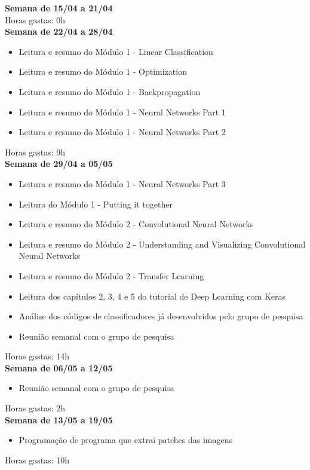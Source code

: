 \documentclass{article}
\begin{document}
\begin{appendices}
{			\textbf{Semana de 15/04 a 21/04} \\
			Horas gastas: 0h \\
			
			\textbf{Semana de 22/04 a 28/04}
			\begin{itemize}
				\item Leitura e resumo do Módulo 1 - Linear Classification 
				\item Leitura e resumo do Módulo 1 - Optimization 
				\item Leitura e resumo do Módulo 1 - Backpropagation 
				\item Leitura e resumo do Módulo 1 - Neural Networks Part 1 
				\item Leitura e resumo do Módulo 1 - Neural Networks Part 2 
			\end{itemize}
			Horas gastas: 9h \\
			
			\textbf{Semana de 29/04 a 05/05}
			\begin{itemize}
				\item Leitura e resumo do Módulo 1 - Neural Networks Part 3 
				\item Leitura do Módulo 1 - Putting it together
				\item Leitura e resumo do Módulo 2 - Convolutional Neural Networks 
				\item Leitura e resumo do Módulo 2 - Understanding and Visualizing Convolutional Neural Networks 
				\item Leitura e resumo do Módulo 2 - Transfer Learning 
				\item Leitura dos capítulos 2, 3, 4 e 5 do tutorial de Deep Learning com Keras
				\item Análise dos códigos de classificadores já desenvolvidos pelo grupo de pesquisa 
				\item Reunião semanal com o grupo de pesquisa 			
			\end{itemize}
			Horas gastas: 14h \\
			
			\textbf{Semana de 06/05 a 12/05}
			\begin{itemize}
				\item Reunião semanal com o grupo de pesquisa 			
			\end{itemize}
			Horas gastas: 2h \\
			
			\textbf{Semana de 13/05 a 19/05}
			\begin{itemize}
				\item Programação de programa que extrai patches das imagens 				
			\end{itemize}
			Horas gastas: 10h \\
			
}
\end{appendices}
\end{document}
